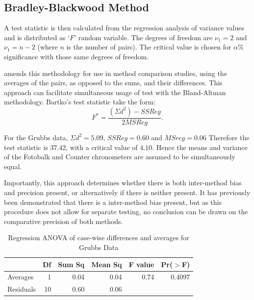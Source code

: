 \documentclass[12pt, a4paper]{report}
\theoremstyle{plain}
\theoremstyle{definition}
\theoremstyle{remark}
\begin{document}
	
	\subsection{Bradley-Blackwood Method}
	
	
	A test statistic is then calculated from the regression analysis
	of variance values \citep{BB89} and is distributed as `$F$' random
	variable. The degrees of freedom are $\nu_{1}=2$ and $\nu_{1}=n-2$
	(where $n$ is the number of pairs). The critical value is chosen
	for $\alpha\%$ significance with those same degrees of freedom.
	
	\citet{Bartko} amends this methodology for use in method
	comparison studies, using the averages of the pairs, as opposed to
	the sums, and their differences. This approach can facilitate
	simultaneous usage of test with the Bland-Altman methodology.
	Bartko's test statistic take the form:
	\[ F^{\ast} = \frac{(\Sigma d^{2})-SSReg}{2MSReg}.\]
	
For the Grubbs data, $\Sigma d^{2}=5.09 $, $SSReg = 0.60$ and
	$MSreg=0.06$ Therefore the test statistic is $37.42$, with a
	critical value of $4.10$. Hence the means and variance of the
	Fotobalk and Counter chronometers are assumed to be simultaneously
	equal.
	
Importantly, this approach determines whether there is both
	inter-method bias and precision present, or alternatively if there
	is neither present. It has previously been demonstrated that there
	is a inter-method bias present, but as this procedure does not
	allow for separate testing, no conclusion can be drawn on the
	comparative precision of both methods.

\begin{table}[ht]
		\begin{center}
			\begin{tabular}{|l|r|r|r|r|r|}
				\hline
				& Df & Sum Sq & Mean Sq & F value & Pr($>$F) \\
				\hline
				Averages & 1 & 0.04 & 0.04 & 0.74 & 0.4097 \\
				Residuals & 10 & 0.60 & 0.06 &  &  \\
				\hline
			\end{tabular}
			\caption{Regression ANOVA of case-wise differences and averages
				for Grubbs Data}
		\end{center}
	\end{table}
	
\end{document}
